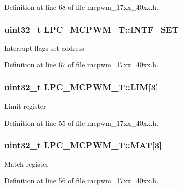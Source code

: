 Definition at line 68 of file mcpwm\+\_\+17xx\+\_\+40xx.\+h.

\subsubsection[{\texorpdfstring{I\+N\+T\+F\+\_\+\+S\+ET}{INTF_SET}}]{ uint32\+\_\+t L\+P\+C\+\_\+\+M\+C\+P\+W\+M\+\_\+\+T\+::\+I\+N\+T\+F\+\_\+\+S\+ET}\hypertarget{structLPC__MCPWM__T_a4c129a22156572b5671ff0e8b9f1977d}{}\label{structLPC__MCPWM__T_a4c129a22156572b5671ff0e8b9f1977d}
Interrupt flags set address 

Definition at line 67 of file mcpwm\+\_\+17xx\+\_\+40xx.\+h.

\subsubsection[{\texorpdfstring{L\+IM}{LIM}}]{ uint32\+\_\+t L\+P\+C\+\_\+\+M\+C\+P\+W\+M\+\_\+\+T\+::\+L\+IM\mbox{[}3\mbox{]}}\hypertarget{structLPC__MCPWM__T_a01c2889381949b5b1f8c2bf8edf9148c}{}\label{structLPC__MCPWM__T_a01c2889381949b5b1f8c2bf8edf9148c}
Limit register 

Definition at line 55 of file mcpwm\+\_\+17xx\+\_\+40xx.\+h.

\subsubsection[{\texorpdfstring{M\+AT}{MAT}}]{ uint32\+\_\+t L\+P\+C\+\_\+\+M\+C\+P\+W\+M\+\_\+\+T\+::\+M\+AT\mbox{[}3\mbox{]}}\hypertarget{structLPC__MCPWM__T_ac3b16a52a48e436af60d17ce27c5c879}{}\label{structLPC__MCPWM__T_ac3b16a52a48e436af60d17ce27c5c879}
Match register 

Definition at line 56 of file mcpwm\+\_\+17xx\+\_\+40xx.\+h.


